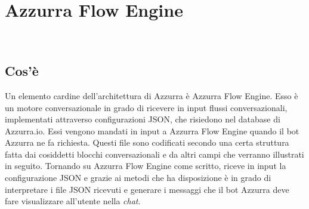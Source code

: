 
\chapter{Azzurra Flow Engine}
\label{cap:flow engine}
\\


\section{Cos'è}
Un elemento cardine dell'architettura di Azzurra è Azzurra Flow Engine. Esso è un motore conversazionale in grado di ricevere in input flussi conversazionali, implementati attraverso configurazioni JSON, che risiedono nel database di Azzurra.io. Essi vengono mandati in input a Azzurra Flow Engine quando il \gls{bot}\ap{[g]} Azzurra ne fa richiesta. Questi file sono codificati secondo una certa struttura fatta dai cosiddetti blocchi conversazionali e da altri campi che verranno illustrati in seguito. Tornando su Azzurra Flow Engine come scritto, riceve in input la configurazione JSON e grazie ai metodi che ha disposizione è in grado di interpretare i file JSON ricevuti e generare i messaggi che il \gls{bot}\ap{[g]} Azzurra deve fare visualizzare all'utente nella \emph{chat}.

